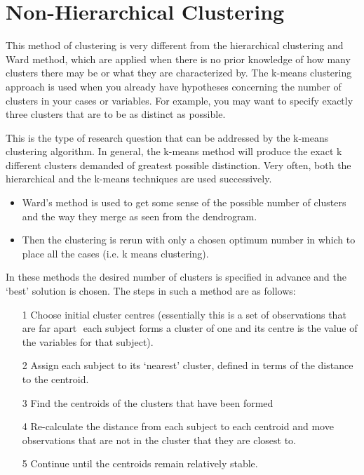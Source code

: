\section{Non-Hierarchical Clustering}
This method of clustering is very different from the hierarchical clustering and Ward method, which are applied when there is no prior knowledge of how many clusters there may be or what they are characterized by. The k-means clustering approach is used when you already have hypotheses concerning the number of clusters in your cases or variables. For example, you may want to specify exactly three clusters that are to be as distinct as possible.

This is the type of research question that can be addressed by the k-means clustering algorithm. In general, the k-means method will produce the exact k different clusters demanded of greatest possible distinction. Very often, both the hierarchical and the k-means techniques are used successively.
\begin{itemize}
\item Ward's method is used to get some sense of the possible number of clusters and the way they merge as seen from the dendrogram.
\item Then the clustering is rerun with only a chosen optimum number in which to place all
the cases (i.e. k means clustering).
\end{itemize}
In these methods the desired number of clusters is specified in advance and the `best' solution
is chosen. The steps in such a method are as follows:
\begin{itemize}
\item[1] Choose initial cluster centres (essentially this is a set of observations that are far apart
 each subject forms a cluster of one and its centre is the value of the variables for
that subject).
\item[2] Assign each subject to its `nearest' cluster, defined in terms of the distance to the
centroid.
\item[3] Find the centroids of the clusters that have been formed
\item[4] Re-calculate the distance from each subject to each centroid and move observations that
are not in the cluster that they are closest to.
\item[5] Continue until the centroids remain relatively stable.
\end{itemize}
